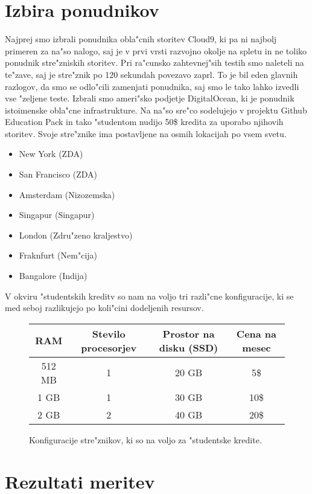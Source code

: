\section{Izbira ponudnikov}
Najprej smo izbrali ponudnika obla"cnih storitev Cloud9, ki pa ni najbolj primeren za na"so nalogo, saj je v prvi vrsti razvojno okolje na spletu in ne toliko ponudnik stre"zniskih storitev. Pri ra"cunsko zahtevnej"sih testih smo naleteli na te"zave, saj je stre"znik po 120 sekundah povezavo zaprl. To je bil eden glavnih razlogov, da smo se odlo"cili zamenjati ponudnika, saj smo le tako lahko izvedli vse "zeljene teste. Izbrali smo ameri"sko podjetje DigitalOcean, ki je ponudnik istoimenske obla"cne infrastrukture. Na na"so sre"co sodelujejo v projektu Github Education Pack  in tako "studentom nudijo 50\$ kredita za uporabo njihovih storitev. Svoje stre"znike ima postavljene na osmih lokacijah po vsem svetu.
\begin{itemize}
\item New York (ZDA)
\item San Francisco (ZDA)
\item Amsterdam (Nizozemska)
\item Singapur (Singapur)
\item London (Zdru"zeno kraljestvo)
\item Fraknfurt (Nem"cija)
\item Bangalore (Indija)
\end{itemize}

V okviru "studentskih kreditv so nam na voljo tri razli"cne konfiguracije, ki se med seboj razlikujejo po koli"cini dodeljenih resursov.

\begin{figure}[!htbp]
  \centering
  \begin{tabular}{ | c | c | c | c | }
    \hline
    RAM & Stevilo procesorjev & Prostor na disku (SSD) & Cena na mesec\\ \hline
    512 MB & 1     & 20 GB &  5\$ \\ \hline
    1 GB & 1 & 30 GB & 10\$ \\ \hline
    2 GB & 2 & 40 GB & 20\$ \\ \hline
  \end{tabular}
  \caption{Konfiguracije stre"znikov, ki so na voljo za "studentske kredite.}
  \label{8_table1}
  \centering
\end{figure}




\section{Rezultati meritev}


